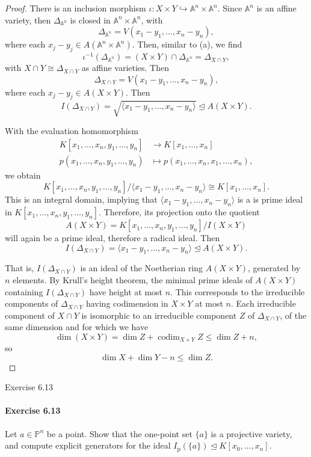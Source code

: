 \documentclass[12pt]{article}
\newenvironment{fullbox}{\begin{lrbox}{\savefullbox}\begin{minipage}{\dimexpr\textwidth-2\fboxsep\relax}}{\end{minipage}\end{lrbox}\begin{center}\framebox[\textwidth]{\usebox{\savefullbox}}\end{center}}
\newenvironment{pbox}[1][]{\begin{fullbox}\ifx#1\empty\else\paragraph{#1}\fi}{\end{fullbox}}
\newcommand{\<}{\langle}
\renewcommand{\>}{\rangle}
\newcommand{\isom}{\cong}
\newcommand{\A}{\mathbb{A}}
\renewcommand{\P}{\mathbb{P}}
\newcommand{\teq}{\trianglelefteq}
\newcommand{\inc}{\hookrightarrow}
\newcommand{\Ip}{I_{\mathrm{p}}}
\newcommand{\rad}{\sqrt}
\DeclareMathOperator{\codim}{codim}
\begin{document}
\begin{proof}
    There is an inclusion morphism $\iota : X \times Y \inc \A^n \times \A^n$. Since $\A^n$ is an affine variety, then $\Delta_{\A^n}$ is closed in $\A^n \times \A^n$, with
    \[
        \Delta_{\A^n} = V(x_1 - y_1, \dots, x_n - y_n),
    \]
    where each $x_j - y_j \in A(\A^n \times \A^n)$. Then, similar to (a), we find
    \[
        \iota^{-1}(\Delta_{\A^n}) = (X \times Y) \cap \Delta_{\A^n} = \Delta_{X \cap Y},
    \]
    with $X \cap Y \isom \Delta_{X \cap Y}$ as affine varieties. Then
    \[
        \Delta_{X \cap Y} = V(x_1 - y_1, \dots, x_n - y_n),
    \]
    where each $x_j - y_j \in A(X \times Y)$. Then
    \[
        I(\Delta_{X \cap Y}) = \rad{\<x_1 - y_1, \dots, x_n - y_n\>} \teq A(X \times Y).
    \]
    
    With the evaluation homomorphism
    \begin{align*}
        K[x_1, \dots, x_n, y_1, \dots, y_n] &\to K[x_1, \dots, x_n] \\
            p(x_1, \dots, x_n, y_1, \dots, y_n) &\mapsto p(x_1, \dots, x_n, x_1, \dots, x_n),
    \end{align*}
    we obtain
    \[
        K[x_1, \dots, x_n, y_1, \dots, y_n]/\<x_1 - y_1, \dots, x_n - y_n\> \isom K[x_1, \dots, x_n].
    \]
    This is an integral domain, implying that $\<x_1 - y_1, \dots, x_n - y_n\>$ is a is prime ideal in $K[x_1, \dots, x_n, y_1, \dots, y_n]$. Therefore, its projection onto the quotient
    \[
        A(X \times Y) = K[x_1, \dots, x_n, y_1, \dots, y_n]/I(X \times Y)
    \]
    will again be a prime ideal, therefore a radical ideal. Then
    \[
        I(\Delta_{X \cap Y}) = \<x_1 - y_1, \dots, x_n - y_n\> \teq A(X \times Y).
    \]

    That is, $I(\Delta_{X \cap Y})$ is an ideal of the Noetherian ring $A(X \times Y)$, generated by $n$ elements. By Krull's height theorem, the minimal prime ideals of $A(X \times Y)$ containing $I(\Delta_{X \cap Y})$ have height at most $n$. This corresponds to the irreducible components of $\Delta_{X \cap Y}$ having codimension in $X \times Y$ at most $n$. Each irreducible component of $X \cap Y$ is isomorphic to an irreducible component $Z$ of $\Delta_{X \cap Y}$, of the same dimension and for which we have
    \[
        \dim(X \times Y) = \dim Z + \codim_{X \times Y} Z \leq \dim Z + n,
    \]
    so
    \[
        \dim X + \dim Y - n \leq \dim Z.
    \]

\end{proof}


\newpage
\begin{pbox}[Exercise 6.13]
    Let $a \in \P^n$ be a point. Show that the one-point set $\{a\}$ is a projective variety, and compute explicit generators for the ideal $\Ip(\{a\}) \teq K[x_0, \dots, x_n]$.
\end{pbox}
\end{document}
